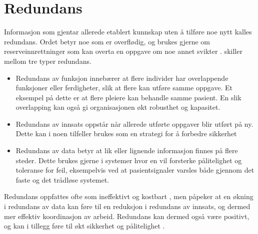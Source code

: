 \section{Redundans}
\label{sec:redundans}

Informasjon som gjentar allerede etablert kunnskap uten å tilføre noe nytt kalles redundans. Ordet betyr noe som er overflødig, og brukes gjerne om reserveinnrettninger som kan overta en oppgave om noe annet svikter \citep{Rosness}. \citet{Cabitza} skiller mellom tre typer redundans. 

\begin{itemize}
\item Redundans av funksjon innebærer at flere individer har overlappende funksjoner eller ferdigheter, slik at flere kan utføre samme oppgave. Et eksempel på dette er at flere pleiere kan behandle samme pasient. En slik overlapping kan også gi organisasjonen økt robusthet og kapasitet.
\item Redundans av innsats oppstår når allerede utførte oppgaver blir utført på ny. Dette kan i noen tilfeller brukes som en strategi for å forbedre sikkerhet \citep{Rygh13}
\item Redundans av data betyr at lik eller lignende informasjon finnes på flere steder.  Dette brukes gjerne i systemer hvor en vil forsterke pålitelighet og toleranse for feil, eksempelvis ved at pasientsignaler varsles både gjennom det faste og det trådløse systemet. 
\end{itemize}
 
\noindent
Redundans oppfattes ofte som ineffektivt og kostbart \citep{Rygh13}, men \citet{Cabitza} påpeker at en økning i redundans av data kan føre til en reduksjon i redundans av innsats, og dermed mer effektiv koordinasjon av arbeid. Redundans kan dermed også være positivt, og kan i tillegg føre til økt sikkerhet og pålitelighet \citep{Rygh13}.
